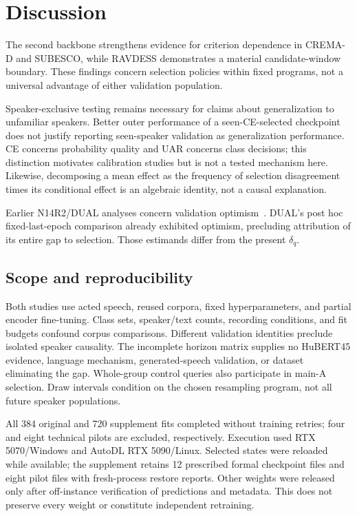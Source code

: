 \documentclass[letterpaper]{article}
\begin{document}
\section{Discussion}
The second backbone strengthens evidence for criterion dependence in CREMA-D and SUBESCO, while RAVDESS demonstrates a material candidate-window boundary. These findings concern selection policies within fixed programs, not a universal advantage of either validation population.

Speaker-exclusive testing remains necessary for claims about generalization to unfamiliar speakers. Better outer performance of a seen-CE-selected checkpoint does not justify reporting seen-speaker validation as generalization performance. CE concerns probability quality and UAR concerns class decisions; this distinction motivates calibration studies but is not a tested mechanism here. Likewise, decomposing a mean effect as the frequency of selection disagreement times its conditional effect is an algebraic identity, not a causal explanation.

Earlier N14R2/DUAL analyses concern validation optimism~\cite{artifact}. DUAL's post hoc fixed-last-epoch comparison already exhibited optimism, precluding attribution of its entire gap to selection. Those estimands differ from the present $\delta_q$.

\subsection{Scope and reproducibility}
Both studies use acted speech, reused corpora, fixed hyperparameters, and partial encoder fine-tuning. Class sets, speaker/text counts, recording conditions, and fit budgets confound corpus comparisons. Different validation identities preclude isolated speaker causality. The incomplete horizon matrix supplies no HuBERT45 evidence, language mechanism, generated-speech validation, or dataset eliminating the gap. Whole-group control queries also participate in main-A selection. Draw intervals condition on the chosen resampling program, not all future speaker populations.

All 384 original and 720 supplement fits completed without training retries; four and eight technical pilots are excluded, respectively. Execution used RTX 5070/Windows and AutoDL RTX 5090/Linux. Selected states were reloaded while available; the supplement retains 12 prescribed formal checkpoint files and eight pilot files with fresh-process restore reports. Other weights were released only after off-instance verification of predictions and metadata. This does not preserve every weight or constitute independent retraining.
\end{document}
